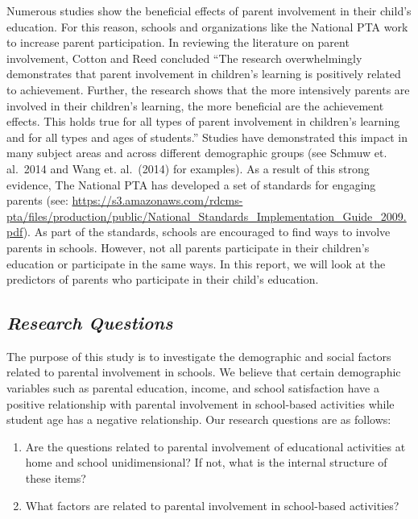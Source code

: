 \documentclass[
  12pt,
]{article}
\providecommand{\tightlist}{%
  \setlength{\itemsep}{0pt}\setlength{\parskip}{0pt}}
\begin{document}
Numerous studies show the beneficial effects of parent involvement in
their child's education. For this reason, schools and organizations like
the National PTA work to increase parent participation. In reviewing the
literature on parent involvement, Cotton and Reed concluded ``The
research overwhelmingly demonstrates that parent involvement in
children's learning is positively related to achievement. Further, the
research shows that the more intensively parents are involved in their
children's learning, the more beneficial are the achievement effects.
This holds true for all types of parent involvement in children's
learning and for all types and ages of students.'' Studies have
demonstrated this impact in many subject areas and across different
demographic groups (see Schmuw et. al.~2014 and Wang et. al.~(2014) for
examples). As a result of this strong evidence, The National PTA has
developed a set of standards for engaging parents (see:
\url{https://s3.amazonaws.com/rdcms-pta/files/production/public/National_Standards_Implementation_Guide_2009.pdf}).
As part of the standards, schools are encouraged to find ways to involve
parents in schools. However, not all parents participate in their
children's education or participate in the same ways. In this report, we
will look at the predictors of parents who participate in their child's
education.

\hypertarget{research-questions}{%
\subsection{\texorpdfstring{\textbf{\emph{Research
Questions}}}{Research Questions}}\label{research-questions}}

The purpose of this study is to investigate the demographic and social
factors related to parental involvement in schools. We believe that
certain demographic variables such as parental education, income, and
school satisfaction have a positive relationship with parental
involvement in school-based activities while student age has a negative
relationship. Our research questions are as follows:

\begin{enumerate}
\def\labelenumi{\arabic{enumi}.}
\tightlist
\item
  Are the questions related to parental involvement of educational
  activities at home and school unidimensional? If not, what is the
  internal structure of these items?
\item
  What factors are related to parental involvement in school-based
  activities?
\end{enumerate}
\end{document}
